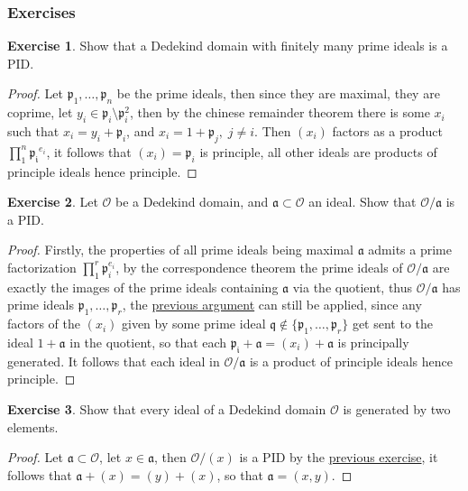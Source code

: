 \documentclass[11pt]{article}
\theoremstyle{definition}
\newtheorem{exe}{Exercise}
\newcommand{\set}[1]{\{#1\}}
\begin{document}
    \subsubsection{Exercises}
    \begin{exe}\label{dedekindfiniteprimes}
        Show that a Dedekind domain with finitely many prime ideals is a PID.
        \begin{proof}
            Let \(\mathfrak{p}_1,\hdots,\mathfrak{p}_n\) be the prime ideals, then since they are maximal, they are coprime, let \(y_i \in \mathfrak{p}_i\setminus\mathfrak{p}_i^2\), then by the chinese remainder theorem there is some \(x_i\) such that \(x_i = y_i + \mathfrak{p}_i\), and \(x_i = 1 + \mathfrak{p}_j, \; j \neq i\). Then \((x_i)\) factors as a product \(\prod_1^n \mathfrak{p_i}^{e_i}\), it follows that \((x_i) = \mathfrak{p}_i\) is principle, all other ideals are products of principle ideals hence principle.
        \end{proof}
    \end{exe}
    \begin{exe}\label{dedekindquot}
        Let \(\mathcal{O}\) be a Dedekind domain, and \(\mathfrak{a} \subset \mathcal{O}\) an ideal. Show that \(\mathcal{O}/\mathfrak{a}\) is a PID.
        \begin{proof}
            Firstly, the properties of all prime ideals being maximal \(\mathfrak{a}\) admits a prime factorization \(\prod_1^r \mathfrak{p}_i^{e_i}\), by the correspondence theorem the prime ideals of \(\mathcal{O}/\mathfrak{a}\) are exactly the images of the prime ideals containing \(\mathfrak{a}\) via the quotient, thus \(\mathcal{O}/\mathfrak{a}\) has prime ideals \(\mathfrak{p}_1,\hdots,\mathfrak{p}_r\), the \hyperref[dedekindfiniteprimes]{previous argument} can still be applied, since any factors of the \((x_i)\) given by some prime ideal \(\mathfrak{q} \not \in \set{\mathfrak{p}_1,\hdots,\mathfrak{p}_r}\) get sent to the ideal \(1 + \mathfrak{a}\) in the quotient, so that each \(\mathfrak{p_i} + \mathfrak{a} = (x_i) + \mathfrak{a}\) is principally generated. It follows that each ideal in \(\mathcal{O}/\mathfrak{a}\) is a product of principle ideals hence principle.
        \end{proof}
    \end{exe}
    \begin{exe}
        Show that every ideal of a  Dedekind domain \(\mathcal{O}\) is generated by two elements.
        \begin{proof}
            Let \(\mathfrak{a} \subset \mathcal{O}\), let \(x \in \mathfrak{a}\), then \(\mathcal{O}/(x)\) is a PID by the \hyperref[dedekindquot]{previous exercise}, it follows that \(\mathfrak{a} + (x) = (y) + (x)\), so that \(\mathfrak{a} = (x,y)\).
        \end{proof}
    \end{exe}
\end{document}

